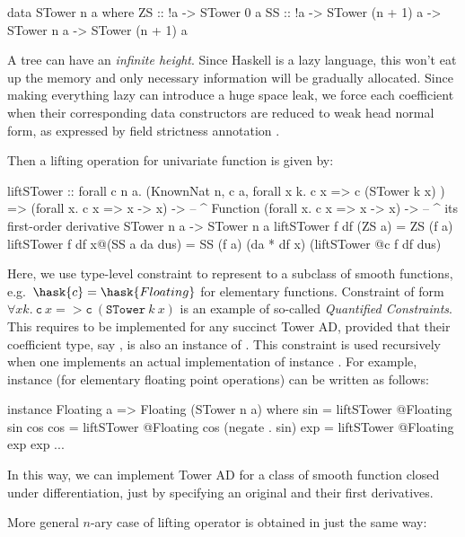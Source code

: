 \documentclass[runningheads]{llncs}
\begin{document}
\begin{code}
data STower n a where
  ZS :: !a -> STower 0 a
  SS :: !a
     -> STower (n + 1) a
     -> STower n a
     -> STower (n + 1) a
\end{code}

A tree can have an \emph{infinite height}.
Since Haskell is a lazy language, this won't eat up the memory and only necessary information will be gradually allocated.
Since making everything lazy can introduce a huge space leak, we force each coefficient  when their corresponding data constructors are reduced to weak head normal form, as expressed by field strictness annotation .

Then a lifting operation for univariate function is given by:

\begin{code}
liftSTower :: forall c n a.
  (KnownNat n, c a, forall x k. c x => c (STower k x) ) =>
  (forall x. c x => x -> x) ->
    -- ^ Function
  (forall x. c x => x -> x) ->
    -- ^ its first-order derivative
  STower n a ->
  STower n a
liftSTower f df (ZS a)
 = ZS (f a)
liftSTower f df x@(SS a da dus)
  = SS (f a) (da * df x) 
       (liftSTower @c f df dus)
\end{code}

Here, we use type-level constraint  to represent to a subclass of smooth functions, e.g.\ $\hask{c} = \hask{Floating}$ for elementary functions.
Constraint of form $\forall x k.\ \texttt{c}\ x => \texttt{c}\ (\texttt{STower}\ k\ x)$ is an example of so-called \emph{Quantified Constraints}.
This requires  to be implemented for any succinct Tower AD, provided that their coefficient type, say , is also an instance of .
This constraint is used recursively when one implements an actual implementation of instance .
For example,  instance (for elementary floating point operations) can be written as follows:

\begin{code}
instance Floating a
      => Floating (STower n a) where
  sin = liftSTower @Floating sin cos
  cos = liftSTower @Floating cos 
          (negate . sin)
  exp = liftSTower @Floating exp exp
  ...
\end{code}

In this way, we can implement Tower AD for a class of smooth function closed under differentiation, just by specifying an original and their first derivatives.

More general $n$-ary case of lifting operator is obtained in just the same way:
\end{document}
